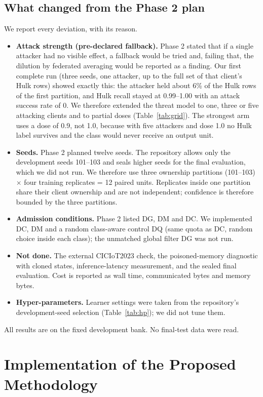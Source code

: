 \documentclass[10pt,a4paper]{article}
\begin{document}
\subsection{What changed from the Phase 2 plan}
We report every deviation, with its reason.
\begin{itemize}
\item \textbf{Attack strength (pre-declared fallback).} Phase 2 stated that if a single attacker had no visible effect, a fallback would be tried and, failing that, the dilution by federated averaging would be reported as a finding. Our first complete run (three seeds, one attacker, up to the full set of that client's Hulk rows) showed exactly this: the attacker held about 6\% of the Hulk rows of the first partition, and Hulk recall stayed at 0.99--1.00 with an attack success rate of 0. We therefore extended the threat model to one, three or five attacking clients and to partial doses (Table~\ref{tab:grid}). The strongest arm uses a dose of 0.9, not 1.0, because with five attackers and dose 1.0 no Hulk label survives and the class would never receive an output unit.
\item \textbf{Seeds.} Phase 2 planned twelve seeds. The repository allows only the development seeds 101--103 and seals higher seeds for the final evaluation, which we did not run. We therefore use three ownership partitions (101--103) $\times$ four training replicates = 12 paired units. Replicates inside one partition share their client ownership and are not independent; confidence is therefore bounded by the three partitions.
\item \textbf{Admission conditions.} Phase 2 listed DG, DM and DC. We implemented DC, DM and a random class-aware control DQ (same quota as DC, random choice inside each class); the unmatched global filter DG was not run.
\item \textbf{Not done.} The external CICIoT2023 check, the poisoned-memory diagnostic with cloned states, inference-latency measurement, and the sealed final evaluation. Cost is reported as wall time, communicated bytes and memory bytes.
\item \textbf{Hyper-parameters.} Learner settings were taken from the repository's development-seed selection (Table~\ref{tab:hp}); we did not tune them.
\end{itemize}
All results are on the fixed development bank. No final-test data were read.

\section{Implementation of the Proposed Methodology}\label{sec:impl}
\end{document}
